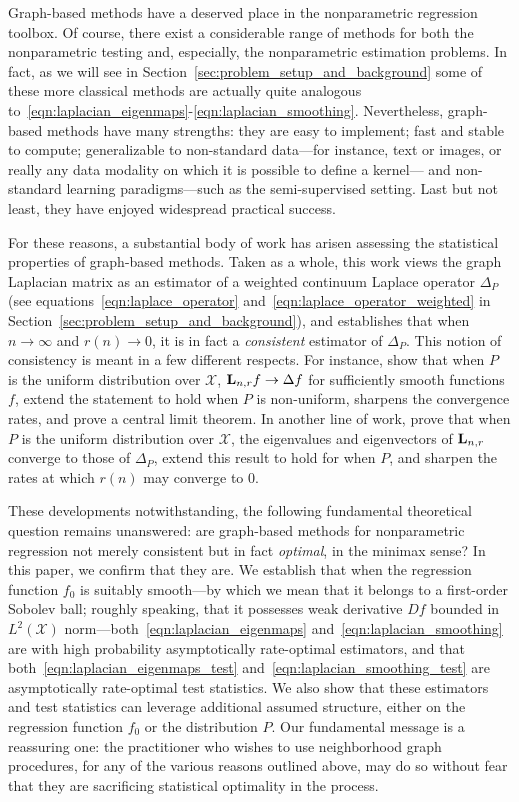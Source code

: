 \documentclass{article}
\newcommand{\1}{\mathbf{1}}
\newcommand{\Lap}{{\bf L}}
\newcommand{\Xset}{\mathcal{X}}
\theoremstyle{alden}
\theoremstyle{aldenthm}
\theoremstyle{definition}
\theoremstyle{remark}
\begin{document}
Graph-based methods have a deserved place in the nonparametric regression toolbox. Of course, there exist a considerable range of methods for both the nonparametric testing and, especially, the nonparametric estimation problems. In fact, as we will see in Section~\ref{sec:problem_setup_and_background} some of these more classical methods are actually quite analogous to~\eqref{eqn:laplacian_eigenmaps}-\eqref{eqn:laplacian_smoothing}. Nevertheless, graph-based methods have many strengths: they are easy to implement; fast and stable to compute; generalizable to non-standard data---for instance, text or images, or really any data modality on which it is possible to define a kernel--- and non-standard learning paradigms---such as the semi-supervised setting. Last but not least, they have enjoyed widespread practical success.

For these reasons, a substantial body of work has arisen assessing the statistical properties of graph-based methods. Taken as a whole, this work views the graph Laplacian matrix as an estimator of a weighted continuum Laplace operator $\Delta_P$ (see equations~\eqref{eqn:laplace_operator} and~\eqref{eqn:laplace_operator_weighted} in Section~\ref{sec:problem_setup_and_background}), and establishes that when $n \to \infty$ and $r(n) \to 0$, it is in fact a \emph{consistent} estimator of $\Delta_P$. This notion of consistency is meant in a few different respects. For instance,  \citet{belkin03,belkin05} show that when $P$ is the uniform distribution over $\Xset$, $\Lap_{n,r}f \to \Delta f$ for sufficiently smooth functions $f$, \citet{lafon04,hein05} extend the statement to hold when $P$ is non-uniform, \citet{singer06} sharpens the convergence rates, and \cite{gine06} prove a central limit theorem. In another line of work, \citet{belkin07} prove that when $P$ is the uniform distribution over $\mathcal{X}$, the eigenvalues and eigenvectors of $\Lap_{n,r}$ converge to those of $\Delta_P$, \citet{garciatrillos18} extend this result to hold for when $P$, and \cite{calder2019} sharpen the rates at which $r(n)$ may converge to $0$. 

These developments notwithstanding, the following fundamental theoretical question remains unanswered: are graph-based methods for nonparametric regression not merely consistent but in fact \emph{optimal}, in the minimax sense? In this paper, we confirm that they are. We establish that when the regression function $f_0$ is suitably smooth---by which we mean that it belongs to a first-order Sobolev ball; roughly speaking, that it possesses weak derivative $Df$ bounded in $L^2(\Xset)$ norm---both~\eqref{eqn:laplacian_eigenmaps} and~\eqref{eqn:laplacian_smoothing} are with high probability asymptotically rate-optimal estimators, and that both~\eqref{eqn:laplacian_eigenmaps_test} and~\eqref{eqn:laplacian_smoothing_test} are asymptotically rate-optimal test statistics. We also show that these estimators and test statistics can leverage additional assumed structure, either on the regression function $f_0$ or the distribution $P$. Our fundamental message is a reassuring one: the practitioner who wishes to use neighborhood graph procedures, for any of the various reasons outlined above, may do so without fear that they are sacrificing statistical optimality in the process.
\end{document}
